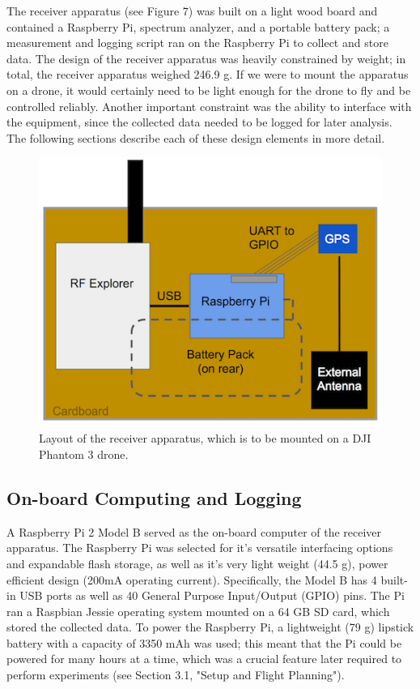 \documentclass[pageno]{jpaper}
\begin{document}
The receiver apparatus (see Figure 7) was built on a light wood board and contained a Raspberry Pi, spectrum analyzer, and a portable battery pack; a measurement and logging script ran on the Raspberry Pi to collect and store data. The design of the receiver apparatus was heavily constrained by weight; in total, the receiver apparatus weighed 246.9 g. If we were to mount the apparatus on a drone, it would certainly need to be light enough for the drone to fly and be controlled reliably. Another important constraint was the ability to interface with the equipment, since the collected data needed to be logged for later analysis. The following sections describe each of these design elements in more detail.

\begin{figure}[h]
	\caption{Layout of the receiver apparatus, which is to be mounted on a DJI Phantom 3 drone.}
	\includegraphics{apparatus}
	\centering
\end{figure}

\subsection{On-board Computing and Logging}
A Raspberry Pi 2 Model B served as the on-board computer of the receiver apparatus. The Raspberry Pi was selected for it's versatile interfacing options and expandable flash storage, as well as it's very light weight (44.5 g), power efficient design (200mA operating current). Specifically, the Model B has 4 built-in USB ports as well as 40 General Purpose Input/Output (GPIO) pins. The Pi ran a Raspbian Jessie operating system mounted on a 64 GB SD card, which stored the collected data. To power the Raspberry Pi, a lightweight (79 g) lipstick battery with a capacity of 3350 mAh was used; this meant that the Pi could be powered for many hours at a time, which was a crucial feature later required to perform experiments (see Section 3.1, "Setup and Flight Planning"). 
\end{document}
